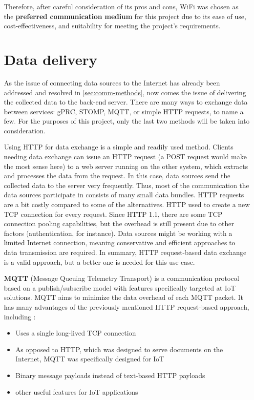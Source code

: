 \documentclass[FM,BP,EN,fonts]{tulthesis}
\begin{document}
Therefore, after careful consideration of its pros and cons, WiFi was chosen as the \textbf{preferred communication medium} for this project due to its ease of use, cost-effectiveness, and suitability for meeting the project's requirements.


\section{Data delivery}
\label{sec:data-delivery}
As the issue of connecting data sources to the Internet has already been addressed and resolved in \autoref{sec:comm-methods}, now comes the issue of delivering the collected data to the back-end server. There are many ways to exchange data between services: gPRC, STOMP, MQTT, or simple HTTP requests, to name a few. For the purposes of this project, only the last two methods will be taken into consideration.

Using HTTP for data exchange is a simple and readily used method. Clients needing data exchange can issue an HTTP request (a POST request would make the most sense here) to a web server running on the other system, which extracts and processes the data from the request. In this case, data sources send the collected data to the server very frequently. Thus, most of the communication the data sources participate in consists of many small data bundles. HTTP requests are a bit costly compared to some of the alternatives. HTTP used to create a new TCP connection for every request. Since HTTP 1.1, there are some TCP connection pooling capabilities, but the overhead is still present due to other factors (authentication, for instance). Data sources might be working with a limited Internet connection, meaning conservative and efficient approaches to data transmission are required. In summary, HTTP request-based data exchange is a valid approach, but a better one is needed for this use case.

\textbf{MQTT} (Message Queuing Telemetry Transport) is a communication protocol based on a publish/subscribe model with features specifically targeted at IoT solutions. MQTT aims to minimize the data overhead of each MQTT packet. It has many advantages of the previously mentioned HTTP request-based approach, including \cite{mqtt-v-http}:
\begin{itemize}
    \item Uses a single long-lived TCP connection
    \item As opposed to HTTP, which was designed to serve documents on the Internet, MQTT was specifically designed for IoT
    \item Binary message payloads instead of text-based HTTP payloads
    \item other useful features for IoT applications
\end{itemize}
\end{document}
